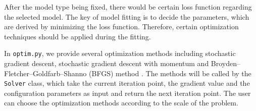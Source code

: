 
After the model type being fixed, there would be certain loss function regarding
the selected model. The key of model fitting is to decide the parameters, which
are derived by minimizing the loss function. Therefore, certain optimization
techniques should be applied during the fitting.

In \texttt{optim.py}, we provide several optimization methods including
stochastic gradient descent, stochastic gradient descent with momentum and
Broyden–Fletcher–Goldfarb–Shanno (BFGS) method \cite{boyd2004convex}.  The
methods will be called by the \texttt{Solver} class, which take the current
iteration point, the gradient value and the configuration parameters as input
and return the next iteration point. The user can choose the optimization
methods according to the scale of the problem.
